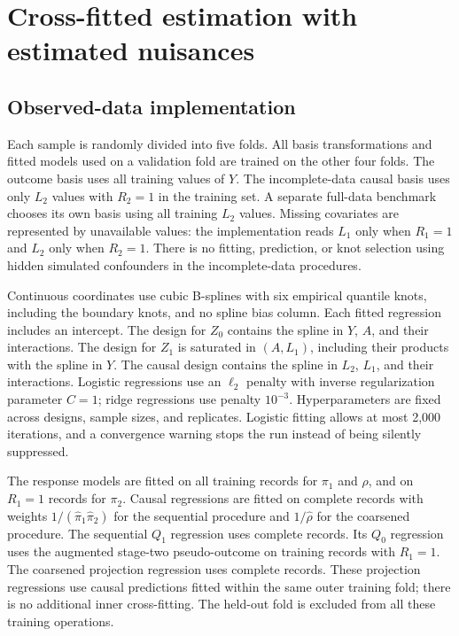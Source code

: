 \section{Cross-fitted estimation with estimated nuisances}\label{app:crossfit}

\subsection*{Observed-data implementation}

Each sample is randomly divided into five folds. All basis transformations and fitted models used on a validation fold are trained on the other four folds. The outcome basis uses all training values of $Y$. The incomplete-data causal basis uses only $L_2$ values with $R_2=1$ in the training set. A separate full-data benchmark chooses its own basis using all training $L_2$ values. Missing covariates are represented by unavailable values: the implementation reads $L_1$ only when $R_1=1$ and $L_2$ only when $R_2=1$. There is no fitting, prediction, or knot selection using hidden simulated confounders in the incomplete-data procedures.

Continuous coordinates use cubic B-splines with six empirical quantile knots, including the boundary knots, and no spline bias column. Each fitted regression includes an intercept. The design for $Z_0$ contains the spline in $Y$, $A$, and their interactions. The design for $Z_1$ is saturated in $(A,L_1)$, including their products with the spline in $Y$. The causal design contains the spline in $L_2$, $L_1$, and their interactions. Logistic regressions use an $\ell_2$ penalty with inverse regularization parameter $C=1$; ridge regressions use penalty $10^{-3}$. Hyperparameters are fixed across designs, sample sizes, and replicates. Logistic fitting allows at most 2,000 iterations, and a convergence warning stops the run instead of being silently suppressed.

The response models are fitted on all training records for $\pi_1$ and $\rho$, and on $R_1=1$ records for $\pi_2$. Causal regressions are fitted on complete records with weights $1/(\widehat\pi_1\widehat\pi_2)$ for the sequential procedure and $1/\widehat\rho$ for the coarsened procedure. The sequential $Q_1$ regression uses complete records. Its $Q_0$ regression uses the augmented stage-two pseudo-outcome on training records with $R_1=1$. The coarsened projection regression uses complete records. These projection regressions use causal predictions fitted within the same outer training fold; there is no additional inner cross-fitting. The held-out fold is excluded from all these training operations.

